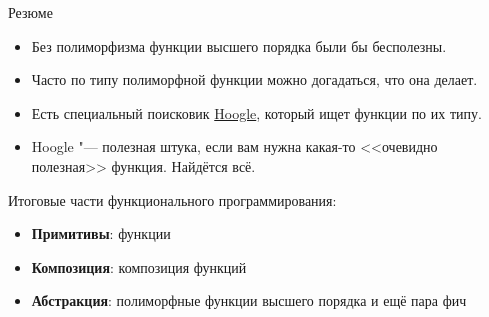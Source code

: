 \begin{frame}{Резюме}
	\begin{itemize}
		\item Без полиморфизма функции высшего порядка были бы бесполезны.
		\item Часто по типу полиморфной функции можно догадаться, что она делает.
		\item Есть специальный поисковик \href{https://www.haskell.org/hoogle/}{Hoogle}, который ищет функции по их типу.
		\item Hoogle "--- полезная штука, если вам нужна какая-то <<очевидно полезная>> функция. Найдётся всё.
	\end{itemize}
	Итоговые части функционального программирования:
	\begin{itemize}
		\item \textbf{Примитивы}: функции
		\item \textbf{Композиция}: композиция функций
		\item \textbf{Абстракция}: полиморфные функции высшего порядка и ещё пара фич
	\end{itemize}
\end{frame}
